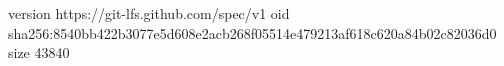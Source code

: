 version https://git-lfs.github.com/spec/v1
oid sha256:8540bb422b3077e5d608e2acb268f05514e479213af618c620a84b02c82036d0
size 43840
